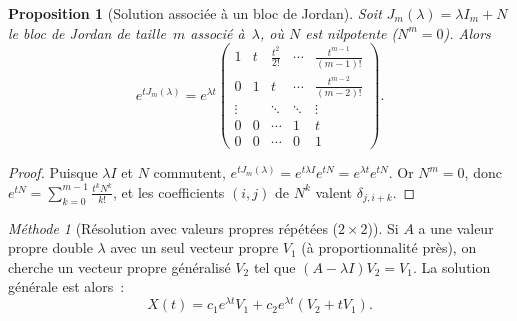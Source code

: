 \documentclass[12pt,a4paper,openany]{book}
\theoremstyle{definition}
\theoremstyle{plain}
\newtheorem{proposition}[definition]{Proposition}
\theoremstyle{remark}
\newtheorem{methode}[definition]{Méthode}
\begin{document}
\begin{proposition}[Solution associée à un bloc de Jordan]\label{prop:sol-jordan}
  Soit $J_m(\lambda) = \lambda I_m + N$ le bloc de Jordan de taille~$m$
  associé à~$\lambda$, où $N$ est nilpotente ($N^m = 0$). Alors
  \[
    e^{tJ_m(\lambda)} = e^{\lambda t}
    \begin{pmatrix}
      1 & t & \frac{t^2}{2!} & \cdots & \frac{t^{m-1}}{(m-1)!} \\
      0 & 1 & t & \cdots & \frac{t^{m-2}}{(m-2)!} \\
      \vdots & & \ddots & \ddots & \vdots \\
      0 & 0 & \cdots & 1 & t \\
      0 & 0 & \cdots & 0 & 1
    \end{pmatrix}.
  \]
\end{proposition}

\begin{proof}
  Puisque $\lambda I$ et $N$ commutent,
  $e^{tJ_m(\lambda)} = e^{t\lambda I} e^{tN} = e^{\lambda t} e^{tN}$.
  Or $N^m = 0$, donc $e^{tN} = \sum_{k=0}^{m-1} \frac{t^k N^k}{k!}$,
  et les coefficients $(i,j)$ de $N^k$ valent $\delta_{j,i+k}$.
\end{proof}

\begin{methode}[Résolution avec valeurs propres répétées ($2 \times 2$)]\label{meth:vp-repetees}
  Si $A$ a une valeur propre double $\lambda$ avec un seul vecteur
  propre $V_1$ (à proportionnalité près), on cherche un vecteur propre
  généralisé $V_2$ tel que $(A - \lambda I)V_2 = V_1$. La solution
  générale est alors~:
  \[
    X(t) = c_1 e^{\lambda t} V_1
         + c_2 e^{\lambda t}(V_2 + tV_1).
  \]
\end{methode}
\end{document}
